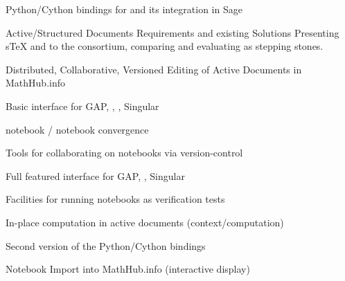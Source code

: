 \begin{workpackage}
\begin{wpdelivs}
  \begin{wpdeliv}[due=6,id=pari-python-lib1,dissem=PU,nature=OTHER,lead=UB,issue=83]
	  {Python/Cython bindings for \Pari and its integration in Sage}
  \end{wpdeliv}
  \begin{wpdeliv}[id=adstex,due=9,miles=startup,nature=R,dissem=PU,lead=JU,issue=91]
    {Active/Structured Documents Requirements and existing Solutions} Presenting sTeX and
    \Jupyter to the consortium, comparing and evaluating as stepping stones.
  \end{wpdeliv}
    \begin{wpdeliv}[id=mathhub-editing,due=18,miles=startup,nature=DEM,dissem=PU,lead=FAU,issue=92]
      {Distributed, Collaborative, Versioned Editing of Active Documents in MathHub.info}
    \end{wpdeliv}
  \begin{wpdeliv}[due=12,miles=proto1,id=ipython-kernels-basic,dissem=PU,nature=OTHER,lead=PS,issue=93]
      {Basic \Jupyter interface for GAP, \PariGP, \Sage, Singular}
  \end{wpdeliv}
  \begin{wpdeliv}[due=12,id=ipython-kernel-sage,miles=startup,dissem=PU,nature=DEM,lead=PS,issue=94]
      {\Sage notebook / \Jupyter notebook convergence}
  \end{wpdeliv}
  \begin{wpdeliv}[due=12,id=jupyter-collab,miles=startup,dissem=PU,nature=OTHER,lead=SR,issue=95]
      {Tools for collaborating on notebooks via version-control}
  \end{wpdeliv}
  \begin{wpdeliv}[due=24,id=ipython-kernels,miles=startup,dissem=PU,nature=OTHER,lead=PS,issue=96]
      {Full featured \Jupyter interface for GAP, \PariGP, Singular}
  \end{wpdeliv}
  \begin{wpdeliv}[due=18,miles=proto1,id=jupyter-test,dissem=PU,nature=OTHER,lead=SR,issue=98]
      {Facilities for running notebooks as verification tests}
  \end{wpdeliv}
  \begin{wpdeliv}[id=adcomp,due=18,miles=proto1,nature=DEM,dissem=PU,lead=JU,issue=97]
    {In-place computation in active documents (context/computation)}
  \end{wpdeliv}
  \begin{wpdeliv}[due=36,miles=proto1,id=pari-python-lib2,dissem=PU,nature=OTHER,lead=UB,issue=84]
	  {Second version of the \Pari Python/Cython bindings}
  \end{wpdeliv}
    \begin{wpdeliv}[id=jupyter-import,due=24,miles=proto1,nature=DEM,dissem=PU,lead=FAU,issue=85]
      {Notebook Import into MathHub.info (interactive display)}
    \end{wpdeliv}


\end{wpdelivs}
\end{workpackage}
